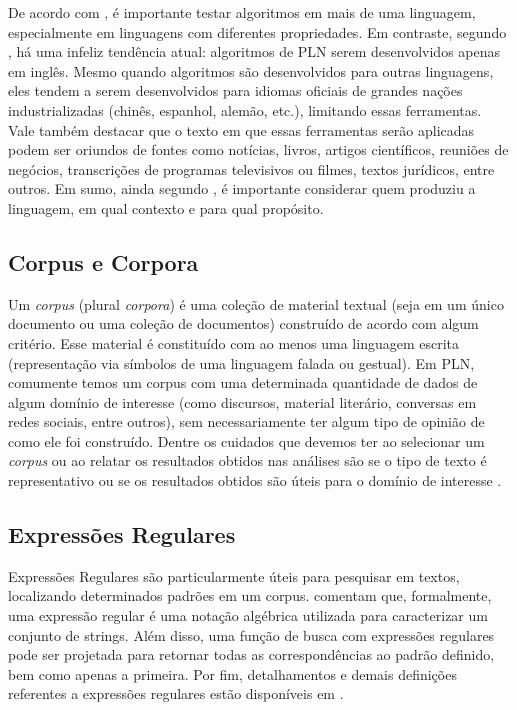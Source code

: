 \documentclass{automatextcc}
\begin{document}
De acordo com \citet{jurafsky2021}, é importante testar algoritmos em mais de uma linguagem, especialmente em linguagens com diferentes propriedades. Em contraste, segundo \citet{bender2019}, há uma infeliz tendência atual: algoritmos de PLN serem desenvolvidos apenas em inglês. Mesmo quando algoritmos são desenvolvidos para outras linguagens, eles tendem a serem desenvolvidos para idiomas oficiais de grandes nações industrializadas (chinês, espanhol, alemão, etc.), limitando essas ferramentas. Vale também destacar que o texto em que essas ferramentas serão aplicadas podem ser oriundos de fontes como notícias, livros, artigos científicos, reuniões de negócios, transcrições de programas televisivos ou filmes, textos jurídicos, entre outros. Em sumo, ainda segundo \citet{jurafsky2021}, é importante considerar quem produziu a linguagem, em qual contexto e para qual propósito.



\subsection{Corpus e Corpora}
Um \textit{corpus} (plural \textit{corpora}) é uma coleção de material textual (seja em um único documento ou uma coleção de documentos) construído de acordo com algum critério. Esse material é constituído com ao menos uma linguagem escrita (representação via símbolos de uma linguagem falada ou gestual). Em PLN, comumente temos um corpus com uma determinada quantidade de dados de algum domínio de interesse (como discursos, material literário, conversas em redes sociais, entre outros), sem necessariamente ter algum tipo de opinião de como ele foi construído. Dentre os cuidados que devemos ter ao selecionar um \textit{corpus} ou ao relatar os resultados obtidos nas análises são se o tipo de texto é representativo ou se os resultados obtidos são úteis para o domínio de interesse \citep{manning1999, kamath2019}.



\subsection{Expressões Regulares}
Expressões Regulares são particularmente úteis para pesquisar em textos, localizando determinados padrões em um corpus. \citet{jurafsky2021} comentam que, formalmente, uma expressão regular é uma notação algébrica utilizada para caracterizar um conjunto de strings. Além disso, uma função de busca com expressões regulares pode ser projetada para retornar todas as correspondências ao padrão definido, bem como apenas a primeira. Por fim, detalhamentos e demais definições referentes a expressões regulares estão disponíveis em \citet{jurafsky2021}.
\end{document}
